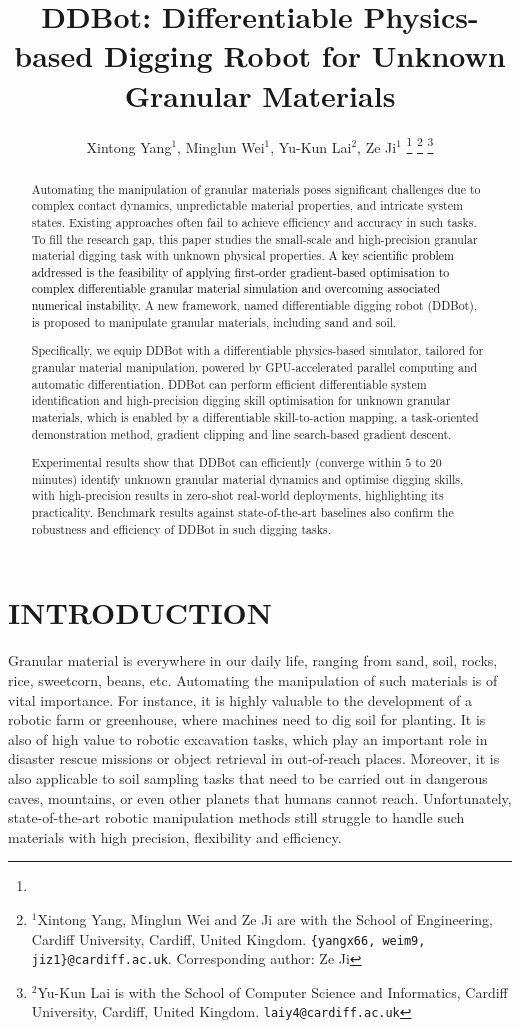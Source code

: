 \documentclass[letterpaper, 10 pt, journal, twoside]{ieeetran}
\title{\LARGE \bf
DDBot: Differentiable Physics-based Digging Robot for Unknown Granular Materials
}
\author{Xintong Yang$^{1}$, Minglun Wei$^{1}$, Yu-Kun Lai$^{2}$, Ze Ji$^{1}$%
\thanks{}%
\thanks{$^{1}$Xintong Yang, Minglun Wei and Ze Ji are with the School of Engineering, Cardiff University, Cardiff, United Kingdom. {\tt\small \{yangx66, weim9, jiz1\}@cardiff.ac.uk}. Corresponding author: Ze Ji}%
\thanks{$^{2}$Yu-Kun Lai is with the School of Computer Science and Informatics, Cardiff University, Cardiff, United Kingdom. {\tt\small laiy4@cardiff.ac.uk}}%
}
\newcommand{\rps}[1]{\textcolor{black}{#1}}
\begin{document}
\maketitle
\thispagestyle{empty}
\pagestyle{empty}

\begin{abstract}
Automating the manipulation of granular materials poses significant challenges due to complex contact dynamics, unpredictable material properties, and intricate system states. Existing approaches often fail to achieve efficiency and accuracy in such tasks. To fill the research gap, this paper studies the small-scale and high-precision granular material digging task with unknown physical properties. \rps{A key scientific problem addressed is the feasibility of applying first-order gradient-based optimisation to complex differentiable granular material simulation and overcoming associated numerical instability.} A new framework, named differentiable digging robot (DDBot), is proposed to manipulate granular materials, including sand and soil.

Specifically, we equip DDBot with a differentiable physics-based simulator, tailored for granular material manipulation, powered by GPU-accelerated parallel computing and automatic differentiation. DDBot can perform efficient differentiable system identification and high-precision digging skill optimisation for unknown granular materials, which is enabled by a differentiable skill-to-action mapping, a task-oriented demonstration method, gradient clipping and line search-based gradient descent.

Experimental results show that DDBot can efficiently (converge within $5$ to $20$ minutes) identify unknown granular material dynamics and optimise digging skills, with high-precision results in zero-shot real-world deployments, highlighting its practicality. Benchmark results against state-of-the-art baselines also confirm the robustness and efficiency of DDBot in such digging tasks.
\end{abstract}

\section{INTRODUCTION} \label{sec:intro}
Granular material is everywhere in our daily life, ranging from sand, soil, rocks, rice, sweetcorn, beans, etc. Automating the manipulation of such materials is of vital importance. For instance, it is highly valuable to the development of a robotic farm or greenhouse, where machines need to dig soil for planting. It is also of high value to robotic excavation tasks, which play an important role in disaster rescue missions or object retrieval in out-of-reach places. Moreover, it is also applicable to soil sampling tasks that need to be carried out in dangerous caves, mountains, or even other planets that humans cannot reach. Unfortunately, state-of-the-art robotic manipulation methods still struggle to handle such materials with high precision, flexibility and efficiency.
\end{document}
